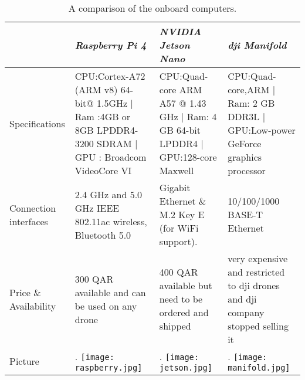 \documentclass[../main.tex]{subfiles}
\begin{document}
\begin{table}[H]
    \centering
    \caption{A comparison of the onboard computers.}
    \label{tab:onboard-computers}  
    \begin{tabular}{ p{3cm} p{4cm} p{4cm} p{4cm} }
        \toprule
        \textit{} & \textit{Raspberry Pi 4} & \textit{NVIDIA Jetson Nano} & \textit{dji Manifold}\\ \midrule
        Specifications  & CPU:Cortex-A72 (ARM v8) 64-bit@ 1.5GHz | Ram :4GB or 8GB LPDDR4-3200 SDRAM | GPU : Broadcom VideoCore VI & CPU:Quad-core ARM A57 @ 1.43 GHz | Ram: 4 GB 64-bit LPDDR4   | GPU:128-core Maxwell & CPU:Quad-core,ARM | Ram: 2 GB DDR3L | GPU:Low-power GeForce graphics processor \\ \addlinespace
        Connection interfaces & 2.4 GHz and 5.0 GHz IEEE 802.11ac wireless, Bluetooth 5.0 & Gigabit Ethernet \& M.2 Key E (for WiFi support). &10/100/1000 BASE-T Ethernet \\ \addlinespace

        Price \& Availability & 300 QAR available and can be used on any drone & 400 QAR available but need to be ordered and shipped & very expensive and restricted to dji drones and dji company stopped selling it \\ \addlinespace
        Picture & \begin{minipage}{.2\textwidth}.
            \texttt{[image: raspberry.jpg]}
            \end{minipage}  & \begin{minipage}{.2\textwidth}.
            \texttt{[image: jetson.jpg]}
            \end{minipage} & \begin{minipage}{.2\textwidth}.
            \texttt{[image: manifold.jpg]}
        \end{minipage} \\
        \bottomrule
        \end{tabular}
    \end{table}
    \newpage
\end{document}
